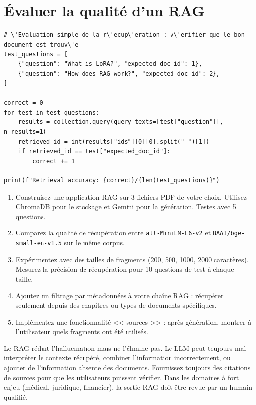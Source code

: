 \section{\'Evaluer la qualit\'e d'un RAG}

\begin{verbatim}
# \'Evaluation simple de la r\'ecup\'eration : v\'erifier que le bon document est trouv\'e
test_questions = [
    {"question": "What is LoRA?", "expected_doc_id": 1},
    {"question": "How does RAG work?", "expected_doc_id": 2},
]

correct = 0
for test in test_questions:
    results = collection.query(query_texts=[test["question"]], n_results=1)
    retrieved_id = int(results["ids"][0][0].split("_")[1])
    if retrieved_id == test["expected_doc_id"]:
        correct += 1

print(f"Retrieval accuracy: {correct}/{len(test_questions)}")
\end{verbatim}

\begin{exercise}
\begin{enumerate}
  \item Construisez une application RAG sur 3 fichiers PDF de votre choix. Utilisez ChromaDB pour le stockage et Gemini pour la g\'en\'eration. Testez avec 5 questions.
  \item Comparez la qualit\'e de r\'ecup\'eration entre \texttt{all-MiniLM-L6-v2} et \texttt{BAAI/bge-small-en-v1.5} sur le m\^eme corpus.
  \item Exp\'erimentez avec des tailles de fragments (200, 500, 1000, 2000 caract\`eres). Mesurez la pr\'ecision de r\'ecup\'eration pour 10 questions de test \`a chaque taille.
  \item Ajoutez un filtrage par m\'etadonn\'ees \`a votre cha\^ine RAG : r\'ecup\'erer seulement depuis des chapitres ou types de documents sp\'ecifiques.
  \item Impl\'ementez une fonctionnalit\'e << sources >> : apr\`es g\'en\'eration, montrer \`a l'utilisateur quels fragments ont \'et\'e utilis\'es.
\end{enumerate}
\end{exercise}

\begin{ethicsbox}
Le RAG r\'eduit l'hallucination mais ne l'\'elimine pas. Le LLM peut toujours mal interpr\'eter le contexte r\'ecup\'er\'e, combiner l'information incorrectement, ou ajouter de l'information absente des documents. Fournissez toujours des citations de sources pour que les utilisateurs puissent v\'erifier. Dans les domaines \`a fort enjeu (m\'edical, juridique, financier), la sortie RAG doit \^etre revue par un humain qualifi\'e.
\end{ethicsbox}

